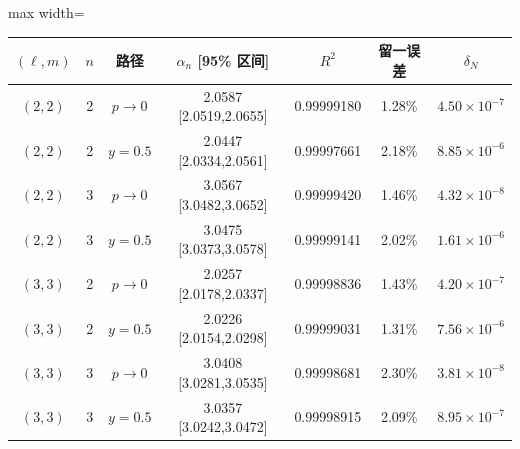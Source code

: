 \documentclass[UTF8,fontset=fandol,11pt,a4paper]{ctexart}
\begin{document}
\par\addvspace{12pt}\noindent\begin{minipage}{\linewidth}
\centering\fontsize{9.5}{12}\selectfont\setlength{\tabcolsep}{3pt}\renewcommand{\arraystretch}{1.18}
\label{audit:tab:power-fit-quality}
\begin{adjustbox}{max width=\linewidth}
\begin{tabular}{c c c c c c c}
\toprule
$(\ell,m)$ & $n$ & 路径 & $\alpha_n$ [95\% 区间] & $R^2$
& 留一误差 & $\delta_N$\\
\midrule
$(2,2)$ & 2 & $p\to0$ & 2.0587 [2.0519,2.0655] & 0.99999180 & 1.28\% & $4.50\times10^{-7}$\\
$(2,2)$ & 2 & $y=0.5$ & 2.0447 [2.0334,2.0561] & 0.99997661 & 2.18\% & $8.85\times10^{-6}$\\
$(2,2)$ & 3 & $p\to0$ & 3.0567 [3.0482,3.0652] & 0.99999420 & 1.46\% & $4.32\times10^{-8}$\\
$(2,2)$ & 3 & $y=0.5$ & 3.0475 [3.0373,3.0578] & 0.99999141 & 2.02\% & $1.61\times10^{-6}$\\
$(3,3)$ & 2 & $p\to0$ & 2.0257 [2.0178,2.0337] & 0.99998836 & 1.43\% & $4.20\times10^{-7}$\\
$(3,3)$ & 2 & $y=0.5$ & 2.0226 [2.0154,2.0298] & 0.99999031 & 1.31\% & $7.56\times10^{-6}$\\
$(3,3)$ & 3 & $p\to0$ & 3.0408 [3.0281,3.0535] & 0.99998681 & 2.30\% & $3.81\times10^{-8}$\\
$(3,3)$ & 3 & $y=0.5$ & 3.0357 [3.0242,3.0472] & 0.99998915 & 2.09\% & $8.95\times10^{-7}$\\
\bottomrule\end{tabular}\end{adjustbox}
\end{minipage}\par\addvspace{9pt}
\end{document}
